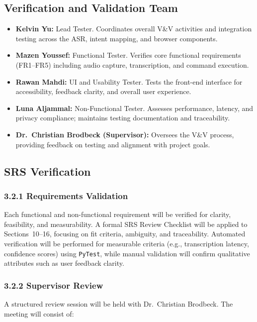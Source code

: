 \documentclass[12pt, titlepage]{article}
\begin{document}
\subsection{Verification and Validation Team}

\begin{itemize}
    \item \textbf{Kelvin Yu:} Lead Tester. Coordinates overall V\&V activities and integration testing across the ASR, intent mapping, and browser components.
    \item \textbf{Mazen Youssef:} Functional Tester. Verifies core functional requirements (FR1--FR5) including audio capture, transcription, and command execution.
    \item \textbf{Rawan Mahdi:} UI and Usability Tester. Tests the front-end interface for accessibility, feedback clarity, and overall user experience.
    \item \textbf{Luna Aljammal:} Non-Functional Tester. Assesses performance, latency, and privacy compliance; maintains testing documentation and traceability.
    \item \textbf{Dr.~Christian Brodbeck (Supervisor):} Oversees the V\&V process, providing feedback on testing and alignment with project goals.
\end{itemize}


\subsection{SRS Verification}

\subsubsection*{3.2.1 Requirements Validation}
Each functional and non-functional requirement will be verified for clarity, feasibility, and measurability. A formal SRS Review Checklist will be applied to Sections~10--16, focusing on fit criteria, ambiguity, and traceability. Automated verification will be performed for measurable criteria (e.g., transcription latency, confidence scores) using \texttt{PyTest}, while manual validation will confirm qualitative attributes such as user feedback clarity.

\subsubsection*{3.2.2 Supervisor Review}
A structured review session will be held with Dr.~Christian Brodbeck. The meeting will consist of:
\end{document}
